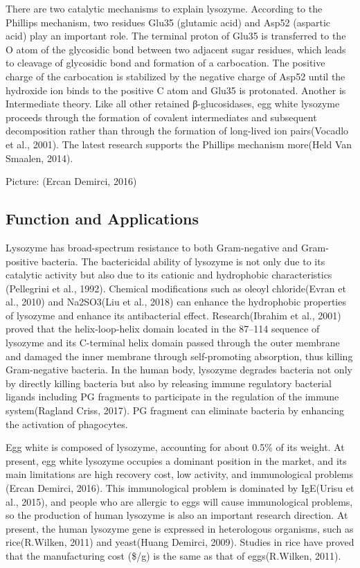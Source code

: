 There are two catalytic mechanisms to explain lysozyme. According to the Phillips mechanism, two residues Glu35 (glutamic acid) and Asp52 (aspartic acid) play an important role. The terminal proton of Glu35 is transferred to the O atom of the glycosidic bond between two adjacent sugar residues, which leads to cleavage of glycosidic bond and formation of a carbocation. The positive charge of the carbocation is stabilized by the negative charge of Asp52 until the hydroxide ion binds to the positive C atom and Glu35 is protonated. Another is Intermediate theory. Like all other retained β-glucosidases, egg white lysozyme proceeds through the formation of covalent intermediates and subsequent decomposition rather than through the formation of long-lived ion pairs(Vocadlo et al., 2001). The latest research supports the Phillips mechanism more(Held  Van Smaalen, 2014).

Picture: (Ercan  Demirci, 2016)
\subsection{Function and Applications}
Lysozyme has broad-spectrum resistance to both Gram-negative and Gram-positive bacteria. The bactericidal ability of lysozyme is not only due to its catalytic activity but also due to its cationic and hydrophobic characteristics (Pellegrini et al., 1992). Chemical modifications such as oleoyl chloride(Evran et al., 2010) and Na2SO3(Liu et al., 2018) can enhance the hydrophobic properties of lysozyme and enhance its antibacterial effect. Research(Ibrahim et al., 2001) proved that the helix-loop-helix domain located in the 87–114 sequence of lysozyme and its C-terminal helix domain passed through the outer membrane and damaged the inner membrane through self-promoting absorption, thus killing Gram-negative bacteria. In the human body, lysozyme degrades bacteria not only by directly killing bacteria but also by releasing immune regulatory bacterial ligands including PG fragments to participate in the regulation of the immune system(Ragland  Criss, 2017). PG fragment can eliminate bacteria by enhancing the activation of phagocytes.

Egg white is composed of lysozyme, accounting for about 0.5\% of its weight. At present, egg white lysozyme occupies a dominant position in the market, and its main limitations are high recovery cost, low activity, and immunological problems (Ercan  Demirci, 2016). This immunological problem is dominated by IgE(Urisu et al., 2015), and people who are allergic to eggs will cause immunological problems, so the production of human lysozyme is also an important research direction. At present, the human lysozyme gene is expressed in heterologous organisms, such as rice(R.Wilken, 2011) and yeast(Huang  Demirci, 2009). Studies in rice have proved that the manufacturing cost (\$/g) is the same as that of eggs(R.Wilken, 2011).



